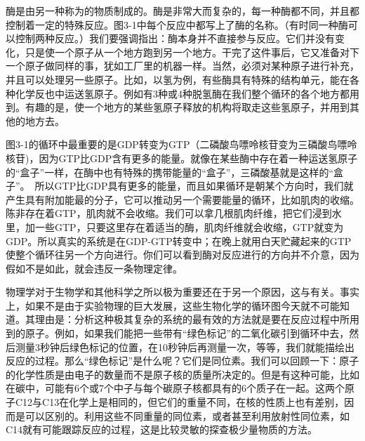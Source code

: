 酶是由另一种称为的物质制成的。酶是非常大而复杂的，每一种酶都不同，并且都控制着一定的特殊反应。图3-1中每个反应中都写上了酶的名称。（有时同一种酶可以控制两种反应。）我们要强调指出：酶本身并不直接参与反应。它们并没有变化，只是使一个原子从一个地方跑到另一个地方。干完了这件事后，它又准备对下一个原子做同样的事，犹如工厂里的机器一样。当然，必须对某种原子进行补充，并且可以处理另一些原子。比如，以氢为例，有些酶具有特殊的结构单元，能在各种化学反也中运送氢原子。例如有3种或4种脱氢酶在我们整个循环的各个地方都用到。有趣的是，使一个地方的某些氢原子释放的机构将取走这些氢原子，并用到其他的地方去。

图3-1的循环中最重要的是GDP转变为GTP（二磷酸鸟嘌呤核苷变为三磷酸鸟嘌呤核苷)，因为GTP比GDP含有更多的能量。就像在某些酶中存在着一种运送氢原子的“盒子”一样，在酶中也有特殊的携带能量的“盒子”，三磷酸基就是这样的“盒子”。　所以GTP比GDP具有更多的能量，而且如果循环是朝某个方向时，我们就产生具有附加能最的分子，它可以推动另一个需要能量的循环，比如肌肉的收缩。陈非存在着GTP，肌肉就不会收缩。我们可以拿几根肌肉纤维，把它们浸到水里，加一些GTP，只要这里存在着适当的酶，肌肉纤维就会收缩，GTP就变为GDP。所以真实的系统是在GDP-GTP转变中；在晚上就用白天贮藏起来的GTP使整个循环往另一个方向进行。你们可以看到酶对反应进行的方向并不介意，因为假如不是如此，就会违反一条物理定律。

物理学对于生物学和其他科学之所以极为重要还在于另一个原因，这与有关。事实上，如果不是由于实验物理的巨大发展，这些生物化学的循环图今天就不可能知道。其理由是：分析这种极其复杂的系统的最有效的方法就是要在反应过程中所用到的原子。例如，如果我们能把一些带有“绿色标记”的二氧化碳引到循环中去，然后测量3秒钟后绿色标记的位置，在10秒钟后再测量一次，等等，我们就能描绘出反应的过程。那么“绿色标记”是什么呢？它们是同位素。我们可以回顾一下：原子的化学性质是由电子的数量而不是原子核的质量所决定的。但是有这种可能，比如在碳中，可能有6个或7个中子与每个碳原子核都具有的6个质子在一起。这两个原子C12与C13在化学上是相同的，但它们的重量不同，在核的性质上也有差别，因而是可以区别的。利用这些不同重量的同位素，或者甚至利用放射性同位素，如C14就有可能跟踪反应的过程，这是比较灵敏的探查极少量物质的方法。

